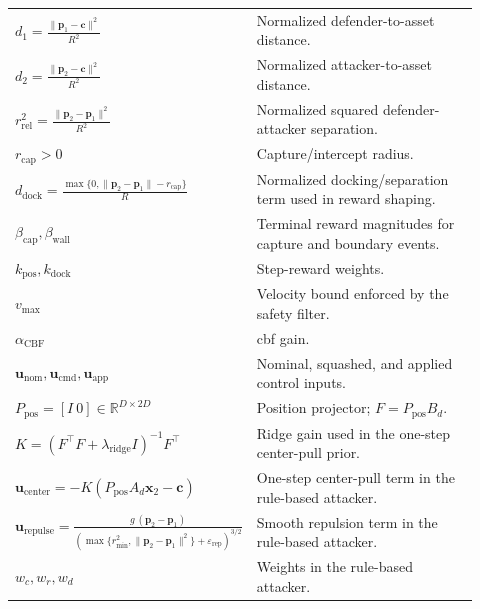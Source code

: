 \begin{longtable}{>{\raggedright\arraybackslash}p{0.42\linewidth}
                  >{\raggedright\arraybackslash}p{0.50\linewidth}}
\(d_1=\tfrac{\|\mathbf{p}_1-\mathbf{c}\|^2}{R^2}\) & Normalized defender-to-asset distance.\\
\(d_2=\tfrac{\|\mathbf{p}_2-\mathbf{c}\|^2}{R^2}\) & Normalized attacker-to-asset distance.\\
\(r_{\mathrm{rel}}^2=\tfrac{\|\mathbf{p}_2-\mathbf{p}_1\|^2}{R^2}\) & Normalized squared defender-attacker separation.\\
\(r_{\mathrm{cap}}>0\) & Capture/intercept radius.\\
\(d_{\mathrm{dock}}=\tfrac{\max\{0,\|\mathbf{p}_2-\mathbf{p}_1\|-r_{\mathrm{cap}}\}}{R}\) & Normalized docking/separation term used in reward shaping.\\
\(\beta_{\mathrm{cap}},\beta_{\mathrm{wall}}\) & Terminal reward magnitudes for capture and boundary events.\\
\(k_{\mathrm{pos}},k_{\mathrm{dock}}\) & Step-reward weights.\\[2pt]

\(v_{\max}\) & Velocity bound enforced by the safety filter.\\
\(\alpha_{\mathrm{CBF}}\) & \acs{cbf} gain.\\
\(\mathbf{u}_{\mathrm{nom}},\mathbf{u}_{\mathrm{cmd}},\mathbf{u}_{\mathrm{app}}\) & Nominal, squashed, and applied control inputs.\\
\(P_{\mathrm{pos}}=[I~0]\in\mathbb{R}^{D\times 2D}\) & Position projector; \(F=P_{\mathrm{pos}}B_d\).\\
\(K=(F^\top F+\lambda_{\mathrm{ridge}} I)^{-1}F^\top\) & Ridge gain used in the one-step center-pull prior.\\
\(\mathbf{u}_{\mathrm{center}}=-K(P_{\mathrm{pos}}A_d\mathbf{x}_2-\mathbf{c})\) & One-step center-pull term in the rule-based attacker.\\
\(\mathbf{u}_{\mathrm{repulse}}=\tfrac{g\,(\mathbf{p}_2-\mathbf{p}_1)}{(\max\{r_{\min}^2,\|\mathbf{p}_2-\mathbf{p}_1\|^2\}+\varepsilon_{\mathrm{rep}})^{3/2}}\) & Smooth repulsion term in the rule-based attacker.\\
\(w_c,w_r,w_d\) & Weights in the rule-based attacker.\\[2pt]


\end{longtable}
